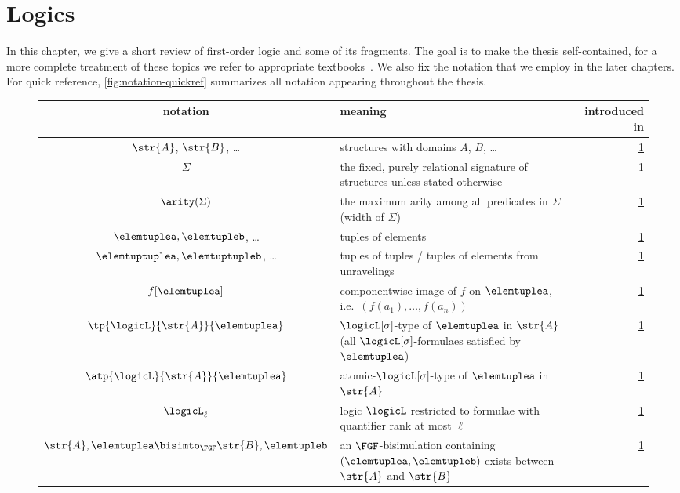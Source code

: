 \chapter{Logics}\label{chap:logics}

In this chapter, we give a short review of first-order logic and some of its fragments.
The goal is to make the thesis self-contained, for a more complete treatment of these topics we refer to appropriate textbooks~\cite{Libkin04,monk1976}.
We also fix the notation that we employ in the later chapters.
For quick reference, \cref{fig:notation-quickref} summarizes all notation appearing throughout the thesis.
\begin{figure}[p]
  \centering
  \bgroup
  \def\arraystretch{1.1}
  \begin{tabularx}{\textwidth}{c X r}
    notation & meaning & introduced in \\
    \hline
    $\str{A}$, $\str{B}$, \ldots & structures with domains $A$, $B$, \ldots & \cref{chap:logics} \\
    $\Sigma$ & the fixed, purely relational signature of structures unless stated otherwise & \cref{chap:logics} \\
    $\arity(\Sigma)$ & the maximum arity among all predicates in $\Sigma$ (width of $\Sigma$) & \cref{chap:logics} \\
    $\elemtuplea, \elemtupleb$, \ldots & tuples of elements & \cref{chap:logics} \\
    $\elemtuptuplea, \elemtuptupleb$, \ldots & tuples of tuples / tuples of elements from unravelings & \cref{chap:logics} \\
    $f[\elemtuplea]$ & componentwise-image of $f$ on $\elemtuplea$, i.e.\ $(f(a_{1}), \ldots, f(a_{n}))$ & \cref{chap:logics} \\
    $\tp{\logicL}{\str{A}}{\elemtuplea}$ & $\logicL[\sigma]$-type of $\elemtuplea$ in $\str{A}$ (all $\logicL[\sigma]$-formulaes satisfied by $\elemtuplea$) & \cref{chap:logics} \\
    $\atp{\logicL}{\str{A}}{\elemtuplea}$ & atomic-$\logicL[\sigma]$-type of $\elemtuplea$ in $\str{A}$ & \cref{chap:logics} \\
    $\logicL_{\ell}$ & logic $\logicL$ restricted to formulae with quantifier rank at most $\ell$ & \cref{chap:logics} \\
    $\str{A}, \elemtuplea \bisimto_{\FGF} \str{B}, \elemtupleb$ & an $\FGF$-bisimulation containing $(\elemtuplea, \elemtupleb)$ exists between $\str{A}$ and $\str{B}$ & \cref{chap:logics} \\

\end{tabularx}
\end{figure}
